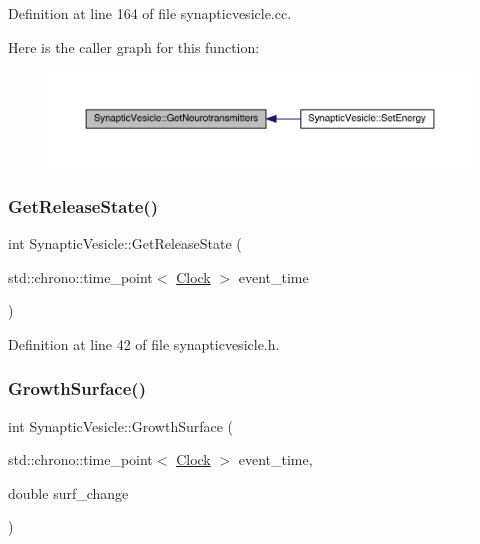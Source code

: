 Definition at line 164 of file synapticvesicle.\+cc.

Here is the caller graph for this function\+:\nopagebreak
\begin{figure}[H]
\begin{center}
\leavevmode
\includegraphics[width=350pt]{class_synaptic_vesicle_ada95d85873125115208ff51f60fa72e9_icgraph}
\end{center}
\end{figure}
\mbox{\label{class_synaptic_vesicle_a6cc0018a0fd02cf99f1ba0ad31f495bc}} 
\subsubsection{\texorpdfstring{Get\+Release\+State()}{GetReleaseState()}}
{\footnotesize\ttfamily int Synaptic\+Vesicle\+::\+Get\+Release\+State (\begin{DoxyParamCaption}\item[{std\+::chrono\+::time\+\_\+point$<$ \hyperlink{universe_8h_a0ef8d951d1ca5ab3cfaf7ab4c7a6fd80}{Clock} $>$}]{event\+\_\+time }\end{DoxyParamCaption})\hspace{0.3cm}{\ttfamily [inline]}}



Definition at line 42 of file synapticvesicle.\+h.

\mbox{\label{class_synaptic_vesicle_a045f27b28b8b11edc884568b390c22fe}} 
\subsubsection{\texorpdfstring{Growth\+Surface()}{GrowthSurface()}}
{\footnotesize\ttfamily int Synaptic\+Vesicle\+::\+Growth\+Surface (\begin{DoxyParamCaption}\item[{std\+::chrono\+::time\+\_\+point$<$ \hyperlink{universe_8h_a0ef8d951d1ca5ab3cfaf7ab4c7a6fd80}{Clock} $>$}]{event\+\_\+time,  }\item[{double}]{surf\+\_\+change }\end{DoxyParamCaption})}



